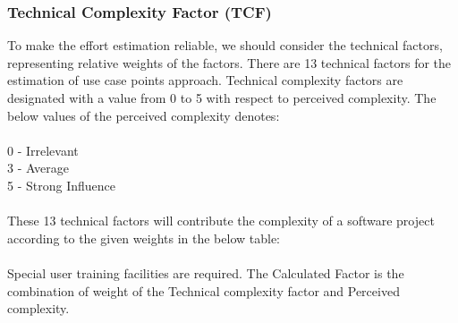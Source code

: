 \documentclass[a4paper, 11pt]{article}
\begin{document}
\subsubsection{Technical Complexity Factor (TCF)}
To make the effort estimation reliable, we should consider the technical factors, representing relative weights of the factors. There are 13 technical factors for the estimation of use case points approach. Technical complexity factors are designated with a value from 0 to 5 with respect to perceived complexity. The below values of the perceived complexity denotes:\\ \\
0 - Irrelevant\\
3 - Average\\
5 - Strong Influence\\ \\
These 13 technical factors will contribute the complexity of a software project according to the given weights in the below table:\\ \\
Special user training facilities are required.
The Calculated Factor is the combination of weight of the Technical complexity factor and Perceived complexity.\\ 
\end{document}
